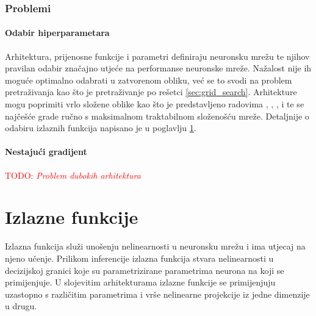 \documentclass[times, utf8, numeric, diplomski]{fer}
\def\TODO#1{\noindent\textcolor{red}{TODO: \textit{#1}}\newline}
\def\todo#1{\TODO{#1}}
\begin{document}
\subsection{Problemi}
\subsubsection{Odabir hiperparametara}
Arhitektura, prijenosne funkcije i parametri definiraju neuronsku mrežu te njihov pravilan odabir značajno utjeće na performanse neuronske mreže. Nažalost nije ih moguće optimalno odabrati u zatvorenom obliku, već se to svodi na problem pretraživanja kao što je pretraživanje po rešetci \ref{sec:grid_search}. Arhitekture mogu poprimiti vrlo složene oblike kao što je predstavljeno radovima \citet{highwaynet}, \citet{resnet}, \citet{densenet}, \citet{inceptionnet} i \citet{yolo} te se najčešće grade ručno s maksimalnom traktabilnom složenošću mreže. Detaljnije o odabiru izlaznih funkcija napisano je u poglavlju \ref{sec:izlazne_fje}.

\subsubsection{Nestajući gradijent}
\label{sec:nestajući_grad}
\todo{Problem dubokih arhitektura}

%

\chapter{Izlazne funkcije}
\label{sec:izlazne_fje}
Izlazna funkcija služi unošenju nelinearnosti u neuronsku mrežu i ima utjecaj na njeno učenje. Prilikom inferencije izlazna funkcija stvara nelinearnosti u decizijskoj granici koje su parametrizirane parametrima neurona na koji se primijenjuje. U slojevitim arhitekturama izlazne funkcije se primijenjuju uzastopno s različitim parametrima i vrše nelinearne projekcije iz jedne dimenzije u drugu.
\end{document}
